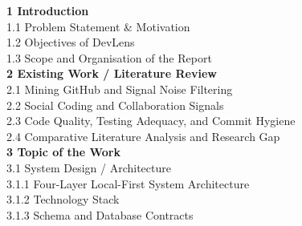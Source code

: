 \documentclass[12pt,a4paper]{article}
\begin{document}
\noindent \textbf{1 \hspace{0.2cm} Introduction } \\
\hspace*{0.6cm} 1.1 \hspace{0.2cm} Problem Statement \& Motivation  \\
\hspace*{0.6cm} 1.2 \hspace{0.2cm} Objectives of DevLens  \\
\hspace*{0.6cm} 1.3 \hspace{0.2cm} Scope and Organisation of the Report  \\
\textbf{2 \hspace{0.2cm} Existing Work / Literature Review } \\
\hspace*{0.6cm} 2.1 \hspace{0.2cm} Mining GitHub and Signal Noise Filtering  \\
\hspace*{0.6cm} 2.2 \hspace{0.2cm} Social Coding and Collaboration Signals  \\
\hspace*{0.6cm} 2.3 \hspace{0.2cm} Code Quality, Testing Adequacy, and Commit Hygiene  \\
\hspace*{0.6cm} 2.4 \hspace{0.2cm} Comparative Literature Analysis and Research Gap  \\
\textbf{3 \hspace{0.2cm} Topic of the Work } \\
\hspace*{0.6cm} 3.1 \hspace{0.2cm} System Design / Architecture  \\
\hspace*{1.2cm} 3.1.1 \hspace{0.2cm} Four-Layer Local-First System Architecture  \\
\hspace*{1.2cm} 3.1.2 \hspace{0.2cm} Technology Stack  \\
\hspace*{1.2cm} 3.1.3 \hspace{0.2cm} Schema and Database Contracts  \\
\end{document}
